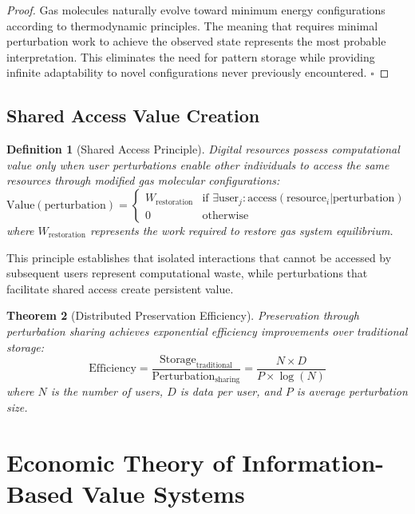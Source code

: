 \documentclass[12pt,a4paper]{article}
\newtheorem{theorem}{Theorem}
\newtheorem{definition}[theorem]{Definition}
\begin{document}
\begin{proof}
Gas molecules naturally evolve toward minimum energy configurations according to thermodynamic principles. The meaning that requires minimal perturbation work to achieve the observed state represents the most probable interpretation. This eliminates the need for pattern storage while providing infinite adaptability to novel configurations never previously encountered. $\square$
\end{proof}

\subsection{Shared Access Value Creation}

\begin{definition}[Shared Access Principle]
Digital resources possess computational value only when user perturbations enable other individuals to access the same resources through modified gas molecular configurations:
\begin{equation}
\text{Value}(\text{perturbation}) = \begin{cases} 
W_{\text{restoration}} & \text{if } \exists \text{user}_j : \text{access}(\text{resource}_i | \text{perturbation}) \\
0 & \text{otherwise}
\end{cases}
\end{equation}
where $W_{\text{restoration}}$ represents the work required to restore gas system equilibrium.
\end{definition}

This principle establishes that isolated interactions that cannot be accessed by subsequent users represent computational waste, while perturbations that facilitate shared access create persistent value.

\begin{theorem}[Distributed Preservation Efficiency]
Preservation through perturbation sharing achieves exponential efficiency improvements over traditional storage:
\begin{equation}
\text{Efficiency} = \frac{\text{Storage}_{\text{traditional}}}{\text{Perturbation}_{\text{sharing}}} = \frac{N \times D}{P \times \log(N)}
\end{equation}
where $N$ is the number of users, $D$ is data per user, and $P$ is average perturbation size.
\end{theorem}

\section{Economic Theory of Information-Based Value Systems}
\end{document}
